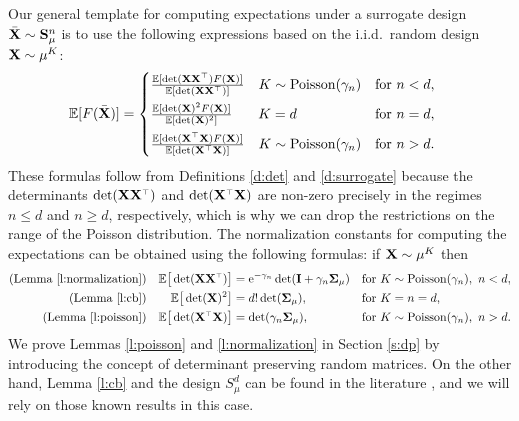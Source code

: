 \documentclass[11pt]{article}
\begin{document}
\noindent
 Our general template for computing expectations under
 a surrogate design ${\bar{\mathbf X}}\sim\mathbf{S}_\mu^n$ is to use the following expressions based on the
i.i.d.~random design $\mathbf X\sim\mu^K$:
\begin{align}
  \E[F(\Xb)] &=\begin{cases}
    \frac{\E[\det(\X\X^\top)F(\X)]}{\E[\det(\X\X^\top)]}
   \quad K\sim\Poisson(\gamma_n)&\text{for }n<d,\\[2mm]
    \frac{\E[\det(\X)^2F(\X)]}{\E[\det(\X)^2]}\hspace{3mm}
    \quad K=d&\text{for }n=d,\\[2mm]
    \frac{\E[\det(\X^\top\X)F(\X)]}{\E[\det(\X^\top\X)]}
   \quad K\sim\Poisson(\gamma_n)&\text{for }n>d.
  \end{cases}\label{eq:cases}
\end{align}
These formulas follow from Definitions \ref{d:det} and
\ref{d:surrogate} because the determinants $\det(\X\X^\top)$ and
$\det(\X^\top\X)$ are non-zero precisely in the regimes $n\leq d$ and
$n\geq d$, respectively, which is why we can drop the restrictions on the
range of the Poisson distribution.
The normalization constants for computing the expectations
can be obtained using the following formulas: if $\mathbf X\sim\mu^K$ then
\begin{align*}
\text{(Lemma~\ref{l:normalization})}&&
\E\big[\det(\X\X^\top)\big]  &= \ee^{-\gamma_n}\det(\I +
\gamma_n\Sigmab_\mu)&&\text{for } K\sim\Poisson(\gamma_n),\ n<d,\\
  \text{(Lemma~\ref{l:cb})}&& \E\big[\det(\X)^2\big] &=
  d!\det(\Sigmab_\mu),&&\text{for } K=n=d,\\
  \text{(Lemma~\ref{l:poisson})}&& \E\big[\det(\X^\top\X)\big]
&=\det(\gamma_n\Sigmab_\mu),&&  \text{for }K\sim\Poisson(\gamma_n),\ n>d.
\end{align*}
We prove Lemmas \ref{l:poisson} and \ref{l:normalization} in Section
\ref{s:dp} by introducing the
concept of determinant preserving random matrices.
On the other hand, Lemma  \ref{l:cb} and the design $S_\mu^d$ can be found in the
literature \citep{expected-generalized-variance,correcting-bias-journal},
and we will rely on those known results in this case.
\end{document}
